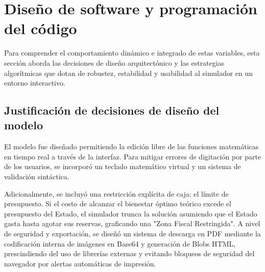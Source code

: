 \documentclass[12pt, a4paper]{article}
\begin{document}
\section{Diseño de software y programación del código}

Para comprender el comportamiento dinámico e integrado de estas variables, esta sección aborda las decisiones de diseño arquitectónico y las estrategias algorítmicas que dotan de robustez, estabilidad y usabilidad al simulador en un entorno interactivo.

\subsection{Justificación de decisiones de diseño del modelo}
El modelo fue diseñado permitiendo la edición libre de las funciones matemáticas en tiempo real a través de la interfaz. Para mitigar errores de digitación por parte de los usuarios, se incorporó un teclado matemático virtual y un sistema de validación sintáctica.

Adicionalmente, se incluyó una restricción explícita de caja: el límite de presupuesto. Si el costo de alcanzar el bienestar óptimo teórico excede el presupuesto del Estado, el simulador trunca la solución asumiendo que el Estado gasta hasta agotar sus reservas, graficando una "Zona Fiscal Restringida". A nivel de seguridad y exportación, se diseñó un sistema de descarga en PDF mediante la codificación interna de imágenes en Base64 y generación de Blobs HTML, prescindiendo del uso de librerías externas y evitando bloqueos de seguridad del navegador por alertas automáticas de impresión.
\end{document}
